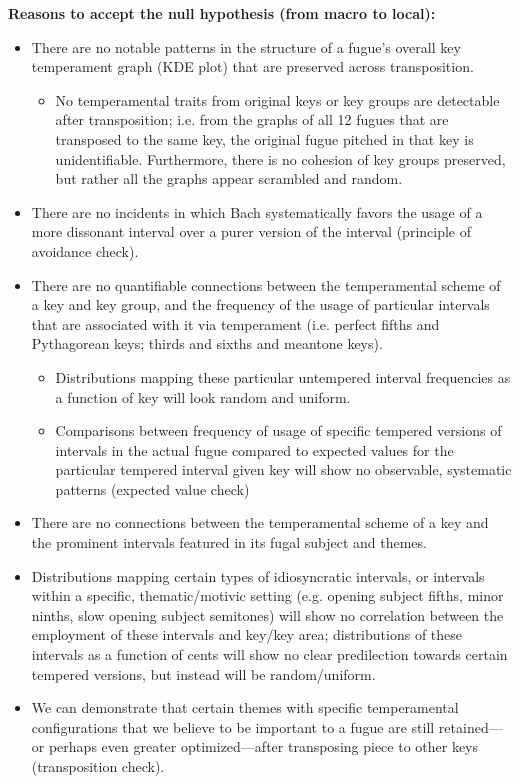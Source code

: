 \textbf{Reasons to accept the null hypothesis (from macro to local):}

\begin{itemize}
\tightlist
\item
  There are no notable patterns in the structure of a fugue's overall
  key temperament graph (KDE plot) that are preserved across
  transposition.

  \begin{itemize}
  \tightlist
  \item
    No temperamental traits from original keys or key groups are
    detectable after transposition; i.e. from the graphs of all 12
    fugues that are transposed to the same key, the original fugue
    pitched in that key is unidentifiable. Furthermore, there is no
    cohesion of key groups preserved, but rather all the graphs appear
    scrambled and random.
  \end{itemize}
\item
  There are no incidents in which Bach systematically favors the usage
  of a more dissonant interval over a purer version of the interval
  (principle of avoidance check).
\item
  There are no quantifiable connections between the temperamental scheme
  of a key and key group, and the frequency of the usage of particular
  intervals that are associated with it via temperament (i.e. perfect
  fifths and Pythagorean keys; thirds and sixths and meantone keys).

  \begin{itemize}
  \tightlist
  \item
    Distributions mapping these particular untempered interval
    frequencies as a function of key will look random and uniform.
  \item
    Comparisons between frequency of usage of specific tempered versions
    of intervals in the actual fugue compared to expected values for the
    particular tempered interval given key will show no observable,
    systematic patterns (expected value check)\\
  \end{itemize}
\item
  There are no connections between the temperamental scheme of a key and
  the prominent intervals featured in its fugal subject and themes.
\item
  Distributions mapping certain types of idiosyncratic intervals, or
  intervals within a specific, thematic/motivic setting (e.g. opening
  subject fifths, minor ninths, slow opening subject semitones) will
  show no correlation between the employment of these intervals and
  key/key area; distributions of these intervals as a function of cents
  will show no clear predilection towards certain tempered versions, but
  instead will be random/uniform.
\item
  We can demonstrate that certain themes with specific temperamental
  configurations that we believe to be important to a fugue are still
  retained---or perhaps even greater optimized---after
  transposing piece to other keys (transposition check).
\end{itemize}


